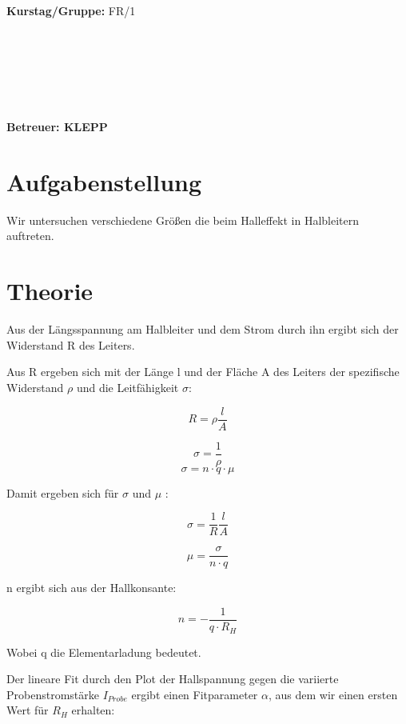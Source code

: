 \documentclass[12pt,a4paper,twopage]{article}
\begin{document}
\begin{verbatim}


\end{verbatim}
			\begin{flushleft}
			\textbf{\Large{Kurstag/Gruppe:}} \Large{FR/1}
			\end{flushleft}

\begin{verbatim}






\end{verbatim}
			\begin{flushleft}
			\LARGE{\textbf{Betreuer:\Large{ KLEPP }}}		
			\end{flushleft}
			
\pagebreak			
			
\section{Aufgabenstellung}
Wir untersuchen verschiedene Größen die beim Halleffekt in Halbleitern auftreten.
\section{Theorie}

Aus der Längsspannung am Halbleiter und dem Strom durch ihn ergibt sich der Widerstand R des Leiters.

Aus R ergeben sich mit der Länge l und der Fläche A des Leiters der spezifische Widerstand $\rho$ und die Leitfähigkeit $\sigma$:

$$ R = \rho \frac{l}{A} $$

$$ \sigma = \frac{1}{\rho} $$
$$ \sigma = n \cdot q \cdot \mu $$

Damit ergeben sich für $\sigma$ und $\mu$ :

$$ \sigma = \frac{1}{R} \frac{l}{A} $$

$$ \mu = \frac{\sigma}{n \cdot q} $$

n ergibt sich aus der Hallkonsante:

$$ n = -\frac{1}{q\cdot R_H} $$

Wobei q die Elementarladung bedeutet.


Der lineare Fit durch den Plot der Hallspannung gegen die variierte Probenstromstärke $I_{Probe}$ ergibt einen Fitparameter $\alpha$, aus dem wir einen ersten Wert für $R_H$ erhalten:
\end{document}
